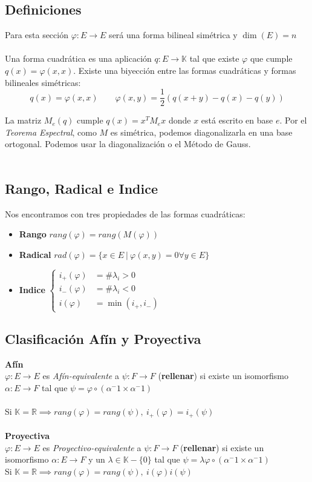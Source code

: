 \documentclass{myclass}
\renewcommand{\phi}{\varphi}
\begin{document}
\subsection{Definiciones}
Para esta sección $\varphi:E\to E$ será una forma bilineal simétrica y $\dim(E)=n$ \\
\\
Una forma cuadrática es una aplicación $q:E\to \mathbb{K}$ tal que existe $\varphi$ que cumple $q(x)=\phi(x,x)$. Existe una biyección entre las formas cuadráticas y formas bilineales simétricas:
$$
q(x) = \phi(x,x) \qquad \varphi(x,y)=\frac{1}{2}(q(x+y)-q(x) - q(y))
$$



La matriz $M_e(q)$ cumple $q(x)= x^TM_ex$ donde $x$ está escrito en base $e$. Por el \textit{Teorema Espectral}, como $M$ es simétrica, podemos diagonalizarla en una base ortogonal. Podemos usar la diagonalización o el Método de Gauss. \\
\\
\subsection{Rango, Radical e Indice}
Nos encontramos con tres propiedades de las formas cuadráticas:
\begin{itemize}
    \item \textbf{Rango} $rang(\phi) = rang(M(\phi))$
    \item \textbf{Radical} $rad(\phi)=\{x\in E \ | \ \phi(x,y)=0 \forall y\in E\}$
    \item \textbf{Indice} $\begin{cases} 
    i_+(\phi) &= \# \lambda_i>0 \\
    i_-(\phi) &= \# \lambda_i<0 \\
    i(\phi) &= \min(i_+, i_-)
    \end{cases}$
\end{itemize}

\subsection{Clasificación Afín y Proyectiva}
\textbf{Afín}\\
$\phi:E\to E$ es \textit{Afín-equivalente} a $\psi:F\to F$ (\textbf{rellenar}) si existe un isomorfismo $\alpha:E\to F$ tal que $\psi = \phi\circ(\alpha^-1\times \alpha^-1)$ \\
\\
Si $\mathbb{K} = \mathbb{R} \implies rang(\phi) = rang(\psi), \ i_+(\phi) = i_+(\psi)$ \\
\\
\textbf{Proyectiva}\\
$\phi:E\to E$ es \textit{Proyectivo-equivalente} a $\psi:F\to F$ (\textbf{rellenar}) si existe un isomorfismo $\alpha:E\to F$ y un $\lambda\in \mathbb{K}-\{0\}$ tal que $\psi = \lambda\phi\circ(\alpha^-1\times \alpha^-1)$ \\
Si $\mathbb{K} = \mathbb{R} \implies rang(\phi) = rang(\psi), \ i(\phi)  i(\psi)$
\end{document}
